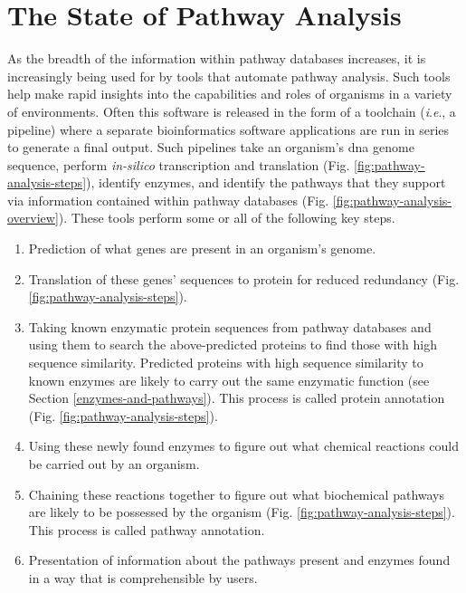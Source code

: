 \section{The State of Pathway Analysis}

As the breadth of the information within pathway databases increases, it is 
increasingly being used for by tools that automate pathway analysis. Such tools 
help make rapid insights into the capabilities and roles of organisms in a 
variety of environments. Often this software is released in the form of a 
toolchain (\textit{i}.\textit{e}., a pipeline) where a separate bioinformatics software 
applications are run in series to generate a final output. Such pipelines take 
an organism's \gls{dna} genome sequence, perform \textit{in-silico} transcription and 
translation (Fig. \ref{fig:pathway-analysis-steps}), identify enzymes, and 
identify the pathways that they support via information contained within pathway 
databases (Fig. \ref{fig:pathway-analysis-overview}). These tools perform some 
or all of the following key steps.

\begin{enumerate}
\item Prediction of what genes are present in an organism's genome.
\item Translation of these genes' sequences to protein for reduced redundancy 
(Fig. \ref{fig:pathway-analysis-steps}).
\item Taking known enzymatic protein sequences from pathway databases and using 
them to search the above-predicted proteins to find those with high sequence 
similarity. Predicted proteins with high sequence similarity to known enzymes 
are likely to carry out the same enzymatic function (see Section 
\ref{enzymes-and-pathways}). This process is called protein annotation (Fig. 
\ref{fig:pathway-analysis-steps}).
\item Using these newly found enzymes to figure out what chemical reactions 
could be carried out by an organism.
\item Chaining these reactions together to figure out what biochemical pathways 
are likely to be possessed by the organism (Fig. 
\ref{fig:pathway-analysis-steps}). This process is called pathway annotation.
\item Presentation of information about the pathways present and enzymes found 
in a way that is comprehensible by users.
\end{enumerate}

